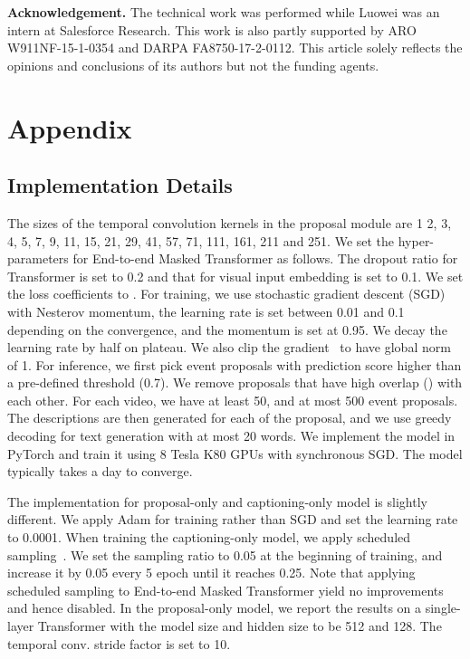 \documentclass[10pt,twocolumn,letterpaper]{article}
\begin{document}
\small{\noindent\textbf{Acknowledgement.} The technical work was performed while Luowei was an intern at Salesforce Research. This work is also partly supported by ARO W911NF-15-1-0354 and DARPA FA8750-17-2-0112. This article solely reflects the opinions and conclusions of its authors but not the funding agents.}

{\small


}

\clearpage
\section{Appendix}

\subsection{Implementation Details}
The sizes of the temporal convolution kernels in the proposal module are 1 2, 3, 4, 5, 7, 9, 11, 15, 21, 29, 41, 57, 71, 111, 161, 211 and 251. We set the hyper-parameters for End-to-end Masked Transformer as follows. The dropout ratio for Transformer is set to 0.2 and that for visual input embedding is set to 0.1. We set the loss coefficients  to . 
For training, we use stochastic gradient descent (SGD) with Nesterov momentum, the learning rate is set between 0.01 and 0.1 depending on the convergence, and the momentum is set at 0.95. We decay the learning rate by half on plateau. We also clip the gradient~\cite{pascanu2013difficulty} to have global  norm of 1. 
For inference, we first pick event proposals with prediction score higher than a pre-defined threshold (0.7). We remove proposals that have high overlap (\ie ) with each other. For each video, we have at least 50, and at most 500 event proposals. 
The descriptions are then generated for each of the proposal, and we use greedy decoding for text generation with at most 20 words.
We implement the model in PyTorch and train it using 8 Tesla K80 GPUs with synchronous SGD. The model typically takes a day to converge.

The implementation for proposal-only and captioning-only model is slightly different. We apply Adam for training rather than SGD and set the learning rate to 0.0001. When training the captioning-only model, we apply scheduled sampling~\cite{bengio2015scheduled}. We set the sampling ratio to 0.05 at the beginning of training, and increase it by 0.05 every 5 epoch until it reaches 0.25. Note that applying scheduled sampling to End-to-end Masked Transformer yield no improvements and hence disabled. In the proposal-only model, we report the results on a single-layer Transformer with the model size and hidden size to be 512 and 128. The temporal conv. stride factor  is set to 10. 
\end{document}
